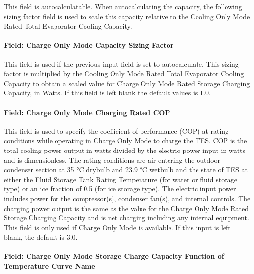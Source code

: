 This field is autocalculatable. When autocalculating the capacity, the following sizing factor field is used to scale this capacity relative to the Cooling Only Mode Rated Total Evaporator Cooling Capacity.

\paragraph{Field: Charge Only Mode Capacity Sizing Factor}\label{field-charge-only-mode-capacity-sizing-factor}

This field is used if the previous input field is set to autocalculate. This sizing factor is multiplied by the Cooling Only Mode Rated Total Evaporator Cooling Capacity to obtain a scaled value for Charge Only Mode Rated Storage Charging Capacity, in Watts. If this field is left blank the default values is 1.0.

\paragraph{Field: Charge Only Mode Charging Rated COP}\label{field-charge-only-mode-charging-rated-cop}

This field is used to specify the coefficient of performance (COP) at rating conditions while operating in Charge Only Mode to charge the TES. COP is the total cooling power output in watts divided by the electric power input in watts and is dimensionless. The rating conditions are air entering the outdoor condenser section at 35 °C drybulb and 23.9 °C wetbulb and the state of TES at either the Fluid Storage Tank Rating Temperature (for water or fluid storage type) or an ice fraction of 0.5 (for ice storage type). The electric input power includes power for the compressor(s), condenser fan(s), and internal controls. The charging power output is the same as the value for the Charge Only Mode Rated Storage Charging Capacity and is net charging including any internal equipment. This field is only used if Charge Only Mode is available. If this input is left blank, the default is 3.0.

\paragraph{Field: Charge Only Mode Storage Charge Capacity Function of Temperature Curve Name}\label{field-charge-only-mode-storage-charge-capacity-function-of-temperature-curve-name}

